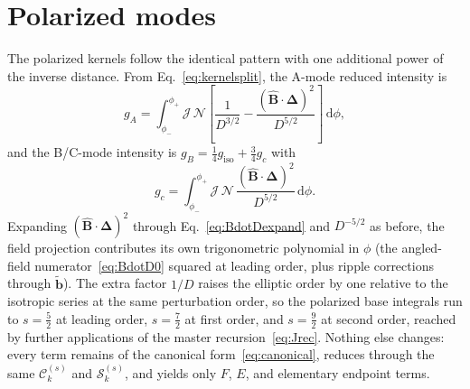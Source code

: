 \documentclass[11pt]{article}
\newcommand{\Del}{\bm{\Delta}}
\newcommand{\Bhat}{\hat{\bm{B}}}
\newcommand{\bperp}{\tilde{\bm{b}}}
\newcommand{\dd}{\,\mathrm{d}}
\newcommand{\Ck}[2]{\mathcal{C}^{(#2)}_{#1}}
\newcommand{\Sk}[2]{\mathcal{S}^{(#2)}_{#1}}
\begin{document}
\section{Polarized modes}
\label{sec:polarized}

The polarized kernels follow the identical pattern with one additional power of the inverse distance. From Eq.~\eqref{eq:kernelsplit}, the A-mode reduced intensity is
\begin{equation}
g_A=\int_{\phi_-}^{\phi_+}\mathcal{J}\,\mathcal{N}\left[\frac{1}{D^{3/2}}-\frac{(\Bhat\cdot\Del)^2}{D^{5/2}}\right]\dd\phi,
\label{eq:gA}
\end{equation}
and the B/C-mode intensity is $g_B=\tfrac14 g_{\mathrm{iso}}+\tfrac34 g_c$ with
\begin{equation}
g_c=\int_{\phi_-}^{\phi_+}\mathcal{J}\,\mathcal{N}\,\frac{(\Bhat\cdot\Del)^2}{D^{5/2}}\dd\phi .
\label{eq:gc}
\end{equation}
Expanding $(\Bhat\cdot\Del)^2$ through Eq.~\eqref{eq:BdotDexpand} and $D^{-5/2}$ as before, the field projection contributes its own trigonometric polynomial in $\phi$ (the angled-field numerator~\eqref{eq:BdotD0} squared at leading order, plus ripple corrections through $\bperp$). The extra factor $1/D$ raises the elliptic order by one relative to the isotropic series at the same perturbation order, so the polarized base integrals run to $s=\tfrac52$ at leading order, $s=\tfrac72$ at first order, and $s=\tfrac92$ at second order, reached by further applications of the master recursion~\eqref{eq:Jrec}. Nothing else changes: every term remains of the canonical form~\eqref{eq:canonical}, reduces through the same $\Ck{k}{s}$ and $\Sk{k}{s}$, and yields only $F$, $E$, and elementary endpoint terms.
\end{document}

